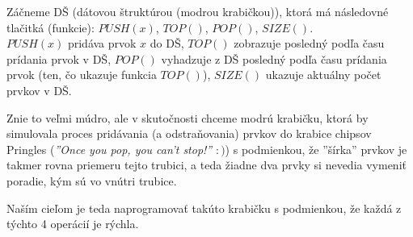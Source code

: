 Záčneme DŠ (dátovou štruktúrou (modrou krabičkou)), ktorá má následovné tlačitká 
(funkcie): 
$PUSH(x)$, $TOP()$, $POP()$, $SIZE()$. \\
$PUSH(x)$ pridáva prvok $x$ do DŠ, $TOP()$ zobrazuje posledný podľa času 
prídania prvok v DŠ, $POP()$ vyhadzuje z DŠ posledný podľa času prídania prvok 
(ten, čo ukazuje funkcia $TOP()$), $SIZE()$ ukazuje aktuálny počet prvkov v DŠ.

Znie to veľmi múdro, ale v skutočnosti chceme modrú krabičku, ktorá by simulovala 
proces pridávania (a odstraňovania) prvkov do krabice chipsov Pringles (\textit{''Once 
you pop, you can't stop!''} $:)$) s podmienkou, že ''šírka'' prvkov je takmer
rovna priemeru tejto trubici, a teda žiadne dva prvky si nevedia vymeniť poradie, 
kým sú vo vnútri trubice. 

Naším cieľom je teda naprogramovať takúto krabičku s podmienkou, že každá z 
týchto 4 operácií je rýchla. 

